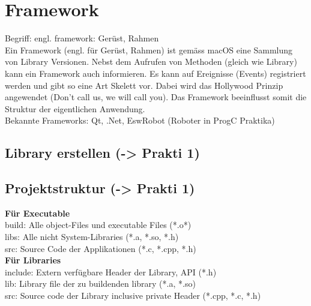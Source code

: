 \section{Framework}
Begriff: engl. framework: Gerüst, Rahmen \\
Ein Framework (engl. für Gerüst, Rahmen) ist gemäss macOS eine Sammlung von Library Versionen. Nebst dem Aufrufen von Methoden (gleich wie  Library) kann ein Framework auch informieren. Es kann auf Ereignisse (Events) registriert werden und gibt so eine Art Skelett vor. Dabei wird das Hollywood Prinzip angewendet (Don't call us, we will call you).
Das Framework beeinflusst somit die Struktur der eigentlichen Anwendung. \\
Bekannte Frameworks: Qt, .Net, EswRobot (Roboter in ProgC Praktika)

\subsection{Library erstellen (-> Prakti 1)}
 
 
\subsection{Projektstruktur  (-> Prakti 1)}
\textbf{Für Executable} \\
build: Alle object-Files und executable Files (*.o*) \\
libs: Alle nicht System-Libraries (*.a, *.so, *.h) \\
src: Source Code der Applikationen (*.c, *.cpp, *.h) \\

\textbf{Für Libraries} \\
include: Extern verfügbare Header der Library, API (*.h) \\
lib: Library file der zu buildenden library (*.a, *.so) \\
src: Source code der Library inclusive private Header (*.cpp, *.c, *.h)


